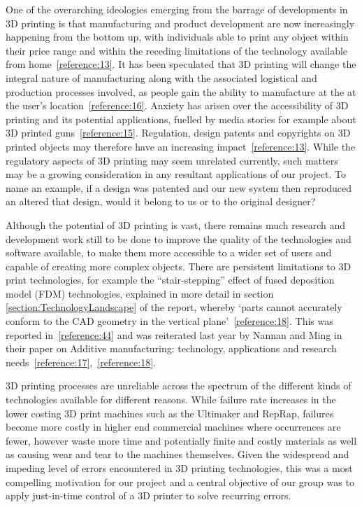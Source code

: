 \documentclass[11pt]{article} %
\begin{document}
One of the overarching ideologies emerging from the barrage of developments in 3D printing is that manufacturing and product development are now increasingly happening from the bottom up, with individuals able to print any object within their price range and within the receding limitations of the technology available from home~\ref{reference:13}. It has been speculated that 3D printing will change the integral nature of manufacturing along with the associated logistical and production processes involved, as people gain the ability to manufacture at the at the user's location~\ref{reference:16}. Anxiety has arisen over the accessibility of 3D printing and its potential applications, fuelled by media stories for example about 3D printed guns~\ref{reference:15}. Regulation, design patents and copyrights on 3D printed objects may therefore have an increasing impact~\ref{reference:13}. While the regulatory aspects of 3D printing may seem unrelated currently, such matters may be a growing consideration in any resultant applications of our project. To name an example, if a design was patented and our new system then reproduced an altered that design, would it belong to us or to the original designer?

Although the potential of 3D printing is vast, there remains much research and development work still to be done to improve the quality of the technologies and software available, to make them more accessible to a wider set of users and capable of creating more complex objects. There are persistent limitations to 3D print technologies, for example the “stair-stepping” effect of fused deposition model (FDM) technologies, explained in more detail in section \ref{section:TechnologyLandscape} of the report, whereby ‘parts cannot accurately conform to the CAD geometry in the vertical plane’~\ref{reference:18}. This was reported in~\ref{reference:44} and was reiterated last year by Nannan and Ming in their paper on Additive manufacturing: technology, applications and research needs~\ref{reference:17},~\ref{reference:18}. 

3D printing processes are unreliable across the spectrum of the different kinds of technologies available for different reasons. While failure rate increases in the lower costing 3D print machines such as the Ultimaker and RepRap, failures become more costly in higher end commercial machines where occurrences are fewer, however waste more time and potentially finite and costly materials as well as causing wear and tear to the machines themselves. Given the widespread and impeding level of errors encountered in 3D printing technologies, this was a most compelling motivation for our project and a central objective of our group was to apply just-in-time control of a 3D printer to solve recurring errors. 
\end{document}
